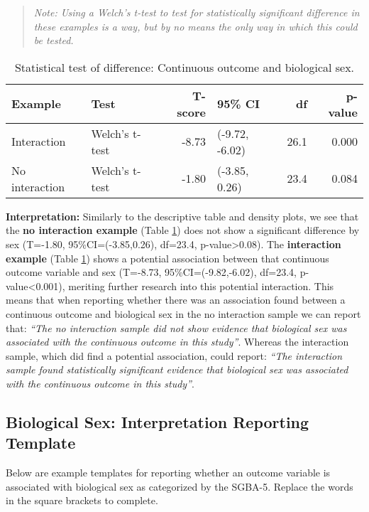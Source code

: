 \documentclass[
]{book}
\begin{document}
\begin{quote}
\emph{Note: Using a Welch's t-test to test for statistically significant difference in these examples is a way, but by no means the only way in which this could be tested.}
\end{quote}

\begin{table}

\caption{\label{tab:04-tab-ttest}Statistical test of difference: Continuous outcome and biological sex.}
\centering
\begin{tabular}[t]{llrlrr}
\toprule
Example & Test & T-score & 95\% CI & df & p-value\\
\midrule
Interaction & Welch's t-test & -8.73 & (-9.72, -6.02) & 26.1 & 0.000\\
No interaction & Welch's t-test & -1.80 & (-3.85, 0.26) & 23.4 & 0.084\\
\bottomrule
\end{tabular}
\end{table}

\textbf{Interpretation:} Similarly to the descriptive table and density plots, we see that the \textbf{no interaction example} (Table \ref{tab:04-tab-ttest}) does not show a significant difference by sex (T=-1.80, 95\%CI=(-3.85,0.26), df=23.4, p-value\textgreater0.08). The \textbf{interaction example} (Table \ref{tab:04-tab-ttest}) shows a potential association between that continuous outcome variable and sex (T=-8.73, 95\%CI=(-9.82,-6.02), df=23.4, p-value\textless0.001), meriting further research into this potential interaction. This means that when reporting whether there was an association found between a continuous outcome and biological sex in the no interaction sample we can report that: {\emph{``The no interaction sample did not show evidence that biological sex was associated with the continuous outcome in this study''}}. Whereas the interaction sample, which did find a potential association, could report: {\emph{``The interaction sample found statistically significant evidence that biological sex was associated with the continuous outcome in this study''}}.

\subsection{Biological Sex: Interpretation Reporting Template}\label{biological-sex-interpretation-reporting-template}

Below are example templates for reporting whether an outcome variable is associated with biological sex as categorized by the SGBA-5. Replace the words in the square brackets to complete.
\end{document}
